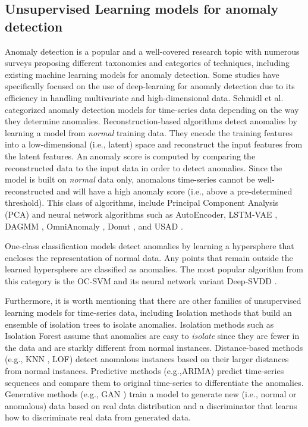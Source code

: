 \subsection{Unsupervised Learning models for anomaly detection}
Anomaly detection is a popular and a well-covered research topic with numerous surveys \cite{chandola2009anomaly, Schmidl2022AnomalyDI, Ren2021DeepVA, Cook2020AnomalyDF} proposing different taxonomies and categories of techniques, including existing machine learning models for anomaly detection. Some studies \cite{Pang2020DeepLF, ruff2021unifying, Choi2021DeepLF, 10043819} have specifically focused on the use of deep-learning for anomaly detection due to its efficiency in handling multivariate and high-dimensional data. Schmidl et al. \cite{Schmidl2022AnomalyDI} categorized anomaly detection models for time-series data depending on the way they determine anomalies.
Reconstruction-based algorithms detect anomalies by learning a model from \textit{normal} training data. They encode the training features into a low-dimensional (i.e., latent) space and reconstruct the input features from the latent features. An anomaly score is computed by comparing the reconstructed data to the input data in order to detect anomalies. Since the model is built on \textit{normal} data only, anomalous time-series cannot be well-reconstructed and will have a high anomaly score (i.e., above a pre-determined threshold). This class of algorithms, include Principal Component Analysis (PCA) and neural network algorithms such as AutoEncoder, LSTM-VAE \cite{park2018multimodal}, DAGMM \cite{zong2018deep}, OmniAnomaly \cite{su2019robust}, Donut \cite{xu2018unsupervised}, and USAD \cite{audibert2020usad}. 

One-class classification models detect anomalies by learning a hypersphere that encloses the representation of normal data. Any points that remain outside the learned hypersphere are classified as anomalies. The most popular algorithm from this category is the OC-SVM \cite{scholkopf1999support} and its neural network variant Deep-SVDD \cite{pmlr-v80-ruff18a}.

Furthermore, it is worth mentioning that there are other families of unsupervised learning models for time-series data, including Isolation methods that build an ensemble of isolation trees to isolate anomalies. Isolation methods such as Isolation Forest \cite{liu2008isolation} assume that anomalies are easy to \textit{isolate} since they are fewer in the data and are starkly different from normal instances. Distance-based methods (e.g., KNN \cite{Ramaswamy2000EfficientAF}, LOF\cite{breunig2000lof}) detect anomalous instances based on their larger distances from normal instances. Predictive methods (e.g.,ARIMA) predict time-series sequences and compare them to original time-series to differentiate the anomalies. Generative methods (e.g., GAN \cite{GoodfellowIan2020GenerativeAN}) train a model to generate new (i.e., normal or anomalous) data based on real data distribution and a discriminator that learns how to discriminate real data from generated data. 

